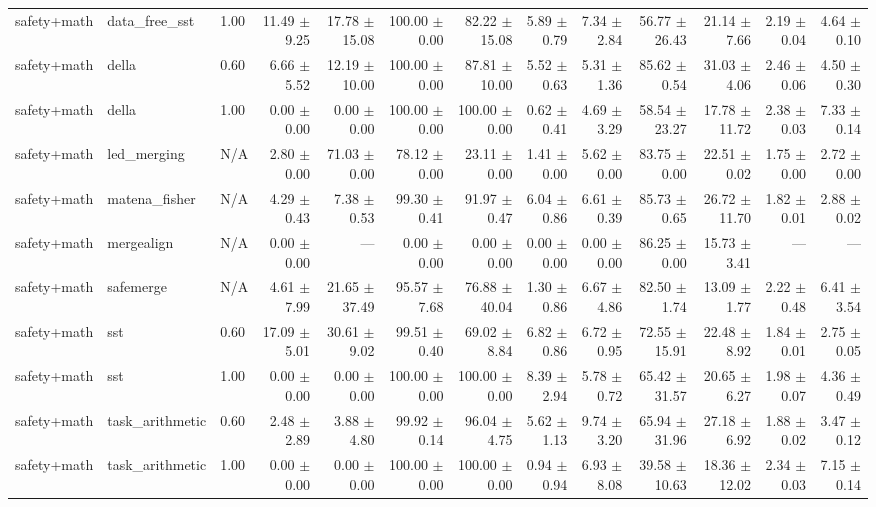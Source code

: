 \documentclass{article}
\begin{document}
{\begin{tabular}{lllrrrrrrrrrr}
safety+math & data\_free\_sst & 1.00 & 11.49 $\pm$ 9.25 & 17.78 $\pm$ 15.08 & 100.00 $\pm$ 0.00 & 82.22 $\pm$ 15.08 & 5.89 $\pm$ 0.79 & 7.34 $\pm$ 2.84 & 56.77 $\pm$ 26.43 & 21.14 $\pm$ 7.66 & 2.19 $\pm$ 0.04 & 4.64 $\pm$ 0.10 \\
safety+math & della & 0.60 & 6.66 $\pm$ 5.52 & 12.19 $\pm$ 10.00 & 100.00 $\pm$ 0.00 & 87.81 $\pm$ 10.00 & 5.52 $\pm$ 0.63 & 5.31 $\pm$ 1.36 & 85.62 $\pm$ 0.54 & 31.03 $\pm$ 4.06 & 2.46 $\pm$ 0.06 & 4.50 $\pm$ 0.30 \\
safety+math & della & 1.00 & 0.00 $\pm$ 0.00 & 0.00 $\pm$ 0.00 & 100.00 $\pm$ 0.00 & 100.00 $\pm$ 0.00 & 0.62 $\pm$ 0.41 & 4.69 $\pm$ 3.29 & 58.54 $\pm$ 23.27 & 17.78 $\pm$ 11.72 & 2.38 $\pm$ 0.03 & 7.33 $\pm$ 0.14 \\
safety+math & led\_merging & N/A & 2.80 $\pm$ 0.00 & 71.03 $\pm$ 0.00 & 78.12 $\pm$ 0.00 & 23.11 $\pm$ 0.00 & 1.41 $\pm$ 0.00 & 5.62 $\pm$ 0.00 & 83.75 $\pm$ 0.00 & 22.51 $\pm$ 0.02 & 1.75 $\pm$ 0.00 & 2.72 $\pm$ 0.00 \\
safety+math & matena\_fisher & N/A & 4.29 $\pm$ 0.43 & 7.38 $\pm$ 0.53 & 99.30 $\pm$ 0.41 & 91.97 $\pm$ 0.47 & 6.04 $\pm$ 0.86 & 6.61 $\pm$ 0.39 & 85.73 $\pm$ 0.65 & 26.72 $\pm$ 11.70 & 1.82 $\pm$ 0.01 & 2.88 $\pm$ 0.02 \\
safety+math & mergealign & N/A & 0.00 $\pm$ 0.00 & --- & 0.00 $\pm$ 0.00 & 0.00 $\pm$ 0.00 & 0.00 $\pm$ 0.00 & 0.00 $\pm$ 0.00 & 86.25 $\pm$ 0.00 & 15.73 $\pm$ 3.41 & --- & --- \\
safety+math & safemerge & N/A & 4.61 $\pm$ 7.99 & 21.65 $\pm$ 37.49 & 95.57 $\pm$ 7.68 & 76.88 $\pm$ 40.04 & 1.30 $\pm$ 0.86 & 6.67 $\pm$ 4.86 & 82.50 $\pm$ 1.74 & 13.09 $\pm$ 1.77 & 2.22 $\pm$ 0.48 & 6.41 $\pm$ 3.54 \\
safety+math & sst & 0.60 & 17.09 $\pm$ 5.01 & 30.61 $\pm$ 9.02 & 99.51 $\pm$ 0.40 & 69.02 $\pm$ 8.84 & 6.82 $\pm$ 0.86 & 6.72 $\pm$ 0.95 & 72.55 $\pm$ 15.91 & 22.48 $\pm$ 8.92 & 1.84 $\pm$ 0.01 & 2.75 $\pm$ 0.05 \\
safety+math & sst & 1.00 & 0.00 $\pm$ 0.00 & 0.00 $\pm$ 0.00 & 100.00 $\pm$ 0.00 & 100.00 $\pm$ 0.00 & 8.39 $\pm$ 2.94 & 5.78 $\pm$ 0.72 & 65.42 $\pm$ 31.57 & 20.65 $\pm$ 6.27 & 1.98 $\pm$ 0.07 & 4.36 $\pm$ 0.49 \\
safety+math & task\_arithmetic & 0.60 & 2.48 $\pm$ 2.89 & 3.88 $\pm$ 4.80 & 99.92 $\pm$ 0.14 & 96.04 $\pm$ 4.75 & 5.62 $\pm$ 1.13 & 9.74 $\pm$ 3.20 & 65.94 $\pm$ 31.96 & 27.18 $\pm$ 6.92 & 1.88 $\pm$ 0.02 & 3.47 $\pm$ 0.12 \\
safety+math & task\_arithmetic & 1.00 & 0.00 $\pm$ 0.00 & 0.00 $\pm$ 0.00 & 100.00 $\pm$ 0.00 & 100.00 $\pm$ 0.00 & 0.94 $\pm$ 0.94 & 6.93 $\pm$ 8.08 & 39.58 $\pm$ 10.63 & 18.36 $\pm$ 12.02 & 2.34 $\pm$ 0.03 & 7.15 $\pm$ 0.14 \\

\end{tabular}}
\end{document}

